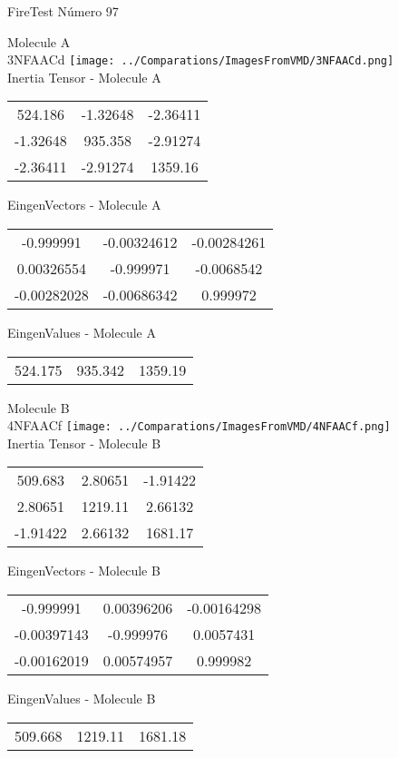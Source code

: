 \vtab[-2cm]
\begin{center}
{\large FireTest \tab Número 97}
\end{center}
\begin{multicols}{2}
\begin{center}

Molecule A \\ 
3NFAACd
\texttt{[image: ../Comparations/ImagesFromVMD/3NFAACd.png]}
\\
Inertia Tensor - Molecule A \\
\vtab

\begin{tabular}{|c c c|}
524.186	 & 	-1.32648	 & 	-2.36411	 \\
-1.32648	 & 	935.358	 & 	-2.91274	 \\
-2.36411	 & 	-2.91274	 & 	1359.16
\end{tabular}

\vtab
 EingenVectors - Molecule A     \\
\vtab
\begin{tabular}{|c c c|}
-0.999991	 & 	-0.00324612	 & 	-0.00284261	 \\
0.00326554	 & 	-0.999971	 & 	-0.0068542	 \\
-0.00282028	 & 	-0.00686342	 & 	0.999972
\end{tabular}

\vtab
 EingenValues - Molecule A     \\
\vtab
\begin{tabular}{|c c c|}
524.175	 & 	935.342	 & 	1359.19	 \\
\end{tabular}
\columnbreak

Molecule B \\ 
4NFAACf
\texttt{[image: ../Comparations/ImagesFromVMD/4NFAACf.png]}
\\
Inertia Tensor - Molecule B \\
\vtab

\begin{tabular}{|c c c|}
509.683	 & 	2.80651	 & 	-1.91422	 \\
2.80651	 & 	1219.11	 & 	2.66132	 \\
-1.91422	 & 	2.66132	 & 	1681.17
\end{tabular}

\vtab
 EingenVectors - Molecule B     \\
\vtab
\begin{tabular}{|c c c|}
-0.999991	 & 	0.00396206	 & 	-0.00164298	 \\
-0.00397143	 & 	-0.999976	 & 	0.0057431	 \\
-0.00162019	 & 	0.00574957	 & 	0.999982
\end{tabular}

\vtab
 EingenValues - Molecule B     \\
\vtab
\begin{tabular}{|c c c|}
509.668	 & 	1219.11	 & 	1681.18	 \\
\end{tabular}

\end{center}
\end{multicols}
